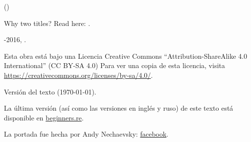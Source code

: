 ﻿\begin{titlepage}


\end{titlepage}

\newpage

\begin{center}
\vspace*{\fill}
{\LARGE \TitleMain}

\bigskip

{\large (\TitleAux)}

\bigskip
\bigskip
Why two titles? Read here: . %

\vspace*{\fill}

{\large \AUTHOR}

{\large \TT{<\EMAIL>}}
\vspace*{\fill}
\vfill

\ccbysa

-2016, \AUTHOR. 

Esta obra est\'a bajo una Licencia Creative Commons ``Attribution-ShareAlike 4.0 International'' (CC BY-SA 4.0)
Para ver una copia de esta licencia, visita \url{https://creativecommons.org/licenses/by-sa/4.0/}.

Versi\'on del texto ({\large \today}).

La \'ultima versi\'on (as\'i como las versiones en ingl\'es y ruso) de este texto est\'a disponible en
\href{http://go.yurichev.com/17009}{beginners.re}.

La portada fue hecha por Andy Nechaevsky: \href{http://go.yurichev.com/17023}{facebook}.

\end{center}
